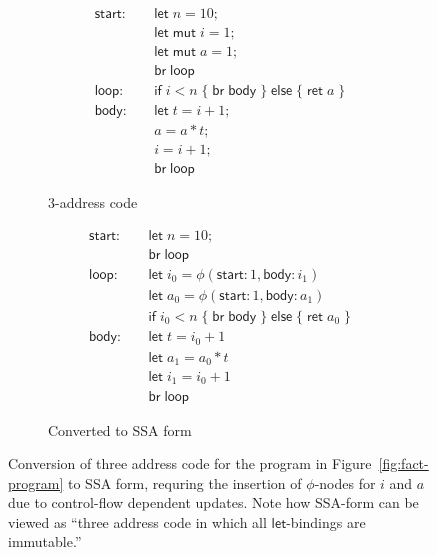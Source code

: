 \documentclass[acmsmall,screen,review]{acmart}
\newcommand{\ms}[1]{\ensuremath{\mathsf{#1}}}
\begin{document}
\begin{figure}
  \begin{subfigure}[t]{.5\textwidth}
    \begin{align*}
      \ms{start}:\quad  & \ms{let}\;n = 10; \\
                        & \ms{let\;mut}\;i = 1; \\
                        & \ms{let\;mut}\;a = 1; \\
                        & \ms{br}\;\ms{loop} \\
      \ms{loop}: \quad  & \ms{if}\;i < n\;
                          \{\;\ms{br}\;\ms{body}\;\}\;
                          \ms{else}\;\{\;\ms{ret}\;a\;\} \\
      \ms{body}: \quad  & \ms{let}\;t = i + 1; \\
                        & a = a * t; \\
                        & i = i + 1; \\
                        & \ms{br}\;\ms{loop}
    \end{align*}
    \caption{3-address code}
  \end{subfigure}%
  \begin{subfigure}[t]{.5\textwidth}
    \begin{align*}
      \ms{start}:\quad & \ms{let}\;n = 10; \\
      & \ms{br}\;\ms{loop} \\
      \ms{loop}: \quad  & \ms{let}\;i_0 = \phi(\ms{start}: 1, \ms{body}: i_1) \\
                        & \ms{let}\;a_0 = \phi(\ms{start}: 1, \ms{body}: a_1) \\
                        & \ms{if}\;i_0 < n\;
                          \{\;\ms{br}\;\ms{body}\;\}\;
                          \ms{else}\;\{\;\ms{ret}\;a_0\;\} \\
      \ms{body}: \quad  & \ms{let}\;t = i_0 + 1 \\
                        & \ms{let}\;a_1 = a_0 * t \\
                        & \ms{let}\;i_1 = i_0 + 1 \\
                        & \ms{br}\;\ms{loop}
    \end{align*}
    \caption{Converted to SSA form}
    \label{fig:fact-ssa}
  \end{subfigure}
  \caption{
    Conversion of three address code for the program in Figure~\ref{fig:fact-program} to SSA 
    form, requring the insertion of $\phi$-nodes for $i$ and $a$ due to control-flow dependent
    updates. Note how SSA-form can be viewed as ``three address code in which all 
    \ms{let}-bindings are immutable.''
  }
  \Description{}
\end{figure}
 
\end{document}
